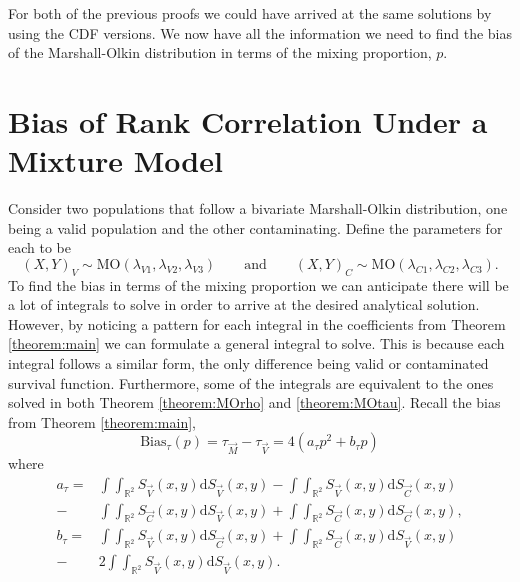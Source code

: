 For both of the previous proofs we could have arrived at the same solutions by using the CDF versions. We now have all the information we need to find the bias of the Marshall-Olkin distribution in terms of the mixing proportion, $p$.
\section{Bias of Rank Correlation Under a Mixture Model}\label{sec:MObias}
\hspace{24pt} Consider two populations that follow a bivariate Marshall-Olkin distribution, one being a valid population and the other contaminating. Define the parameters for each to be $$\left(X,Y\right)_V\sim\text{MO}\left(\lambda_{V1},\lambda_{V2},\lambda_{V3}\right)\qquad\text{and}\qquad\left(X,Y\right)_C\sim\text{MO}\left(\lambda_{C1},\lambda_{C2},\lambda_{C3}\right).$$
To find the bias in terms of the mixing proportion we can anticipate there will be a lot of integrals to solve in order to arrive at the desired analytical solution. However, by noticing a pattern for each integral in the coefficients from Theorem \ref{theorem:main} we can formulate a general integral to solve. This is because each integral follows a similar form, the only difference being valid or contaminated survival function. Furthermore, some of the integrals are equivalent to the ones solved in both Theorem \ref{theorem:MOrho} and \ref{theorem:MOtau}. Recall the bias from Theorem \ref{theorem:main}, $$\text{Bias}_{\tau}\left(p\right)=\tau_{\vec{M}}-\tau_{\vec{V}}=4\left(a_{\tau}p^2+b_{\tau}p\right)$$ where
\begin{align*}
    a_\tau=&\int\int_{\mathbb{R}^2}S_{\vec{V}}(x,y)\mathrm{d}S_{\vec{V}}(x,y)-\int\int_{\mathbb{R}^2}S_{\vec{V}}(x,y)\mathrm{d}S_{\vec{C}}(x,y)\\
    -&\int\int_{\mathbb{R}^2}S_{\vec{C}}(x,y)\mathrm{d}S_{\vec{V}}(x,y)+\int\int_{\mathbb{R}^2}S_{\vec{C}}(x,y)\mathrm{d}S_{\vec{C}}(x,y),\\
    b_\tau=&\int\int_{\mathbb{R}^2}S_{\vec{V}}(x,y)\mathrm{d}S_{\vec{C}}(x,y)+\int\int_{\mathbb{R}^2}S_{\vec{C}}(x,y)\mathrm{d}S_{\vec{V}}(x,y)\\
    -&2\int\int_{\mathbb{R}^2}S_{\vec{V}}(x,y)\mathrm{d}S_{\vec{V}}(x,y).
\end{align*}

